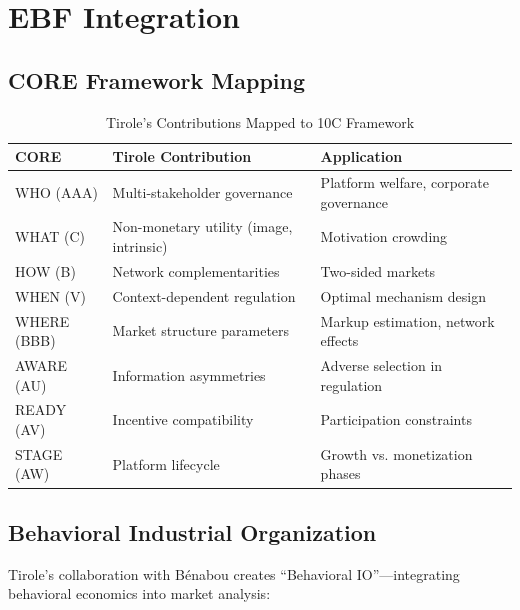 \section{EBF Integration}
\label{sec:jt-integration}

\subsection{CORE Framework Mapping}

\begin{table}[htbp]
\centering
\caption{Tirole's Contributions Mapped to 10C Framework}
\label{tab:jt-9c-mapping}
\begin{tabular}{lll}
\toprule
\textbf{CORE} & \textbf{Tirole Contribution} & \textbf{Application} \\
\midrule
WHO (AAA) & Multi-stakeholder governance & Platform welfare, corporate governance \\
WHAT (C) & Non-monetary utility (image, intrinsic) & Motivation crowding \\
HOW (B) & Network complementarities & Two-sided markets \\
WHEN (V) & Context-dependent regulation & Optimal mechanism design \\
WHERE (BBB) & Market structure parameters & Markup estimation, network effects \\
AWARE (AU) & Information asymmetries & Adverse selection in regulation \\
READY (AV) & Incentive compatibility & Participation constraints \\
STAGE (AW) & Platform lifecycle & Growth vs. monetization phases \\
\bottomrule
\end{tabular}
\end{table}

\subsection{Behavioral Industrial Organization}

Tirole's collaboration with Bénabou creates ``Behavioral IO''---integrating behavioral economics into market analysis:

